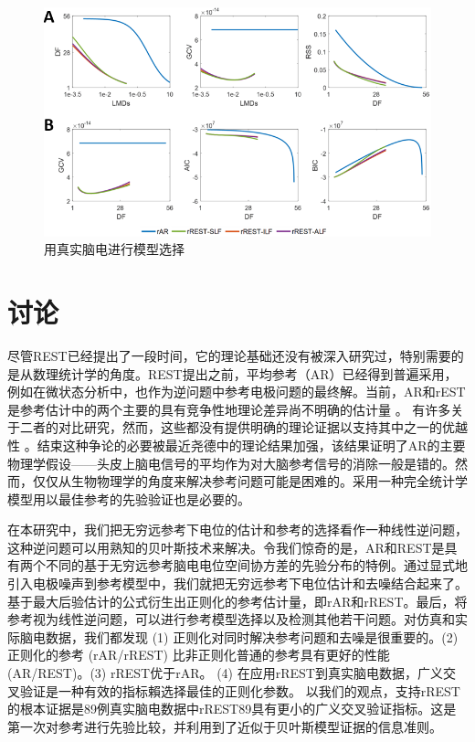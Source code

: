 \begin{figure}[!ht]
	\centering
	\includegraphics[width=15cm]{pic/Frontier/figure8.png}
	\caption{用真实脑电进行模型选择}
	\label{3.8}
\end{figure}

\section{讨论}
尽管REST已经提出了一段时间，它的理论基础还没有被深入研究过，特别需要的是从数理统计学的角度。REST提出之前，平均参考（AR）已经得到普遍采用，例如在微状态分析中，也作为逆问题中参考电极问题的最终解。当前，AR和rEST是参考估计中的两个主要的具有竞争性地理论差异尚不明确的估计量 。 有许多关于二者的对比研究，然而，这些都没有提供明确的理论证据以支持其中之一的优越性
。结束这种争论的必要被最近尧德中的理论结果加强，该结果证明了AR的主要物理学假设——头皮上脑电信号的平均作为对大脑参考信号的消除一般是错的。然而，仅仅从生物物理学的角度来解决参考问题可能是困难的。采用一种完全统计学模型用以最佳参考的先验验证也是必要的。

在本研究中，我们把无穷远参考下电位的估计和参考的选择看作一种线性逆问题，这种逆问题可以用熟知的贝叶斯技术来解决。令我们惊奇的是，AR和REST是具有两个不同的基于无穷远参考脑电电位空间协方差的先验分布的特例。通过显式地引入电极噪声到参考模型中，我们就把无穷远参考下电位估计和去噪结合起来了。基于最大后验估计的公式衍生出正则化的参考估计量，即rAR和rREST。最后，将参考视为线性逆问题，可以进行参考模型选择以及检测其他若干问题。对仿真和实际脑电数据，我们都发现 (1) 正则化对同时解决参考问题和去噪是很重要的。(2) 正则化的参考 (rAR/rREST) 比非正则化普通的参考具有更好的性能
(AR/REST)。(3) rREST优于rAR。 (4) 在应用rREST到真实脑电数据，广义交叉验证是一种有效的指标賴选择最佳的正则化参数。 以我们的观点，支持rREST的根本证据是89例真实脑电数据中rREST89具有更小的广义交叉验证指标。这是第一次对参考进行先验比较，并利用到了近似于贝叶斯模型证据的信息准则。

